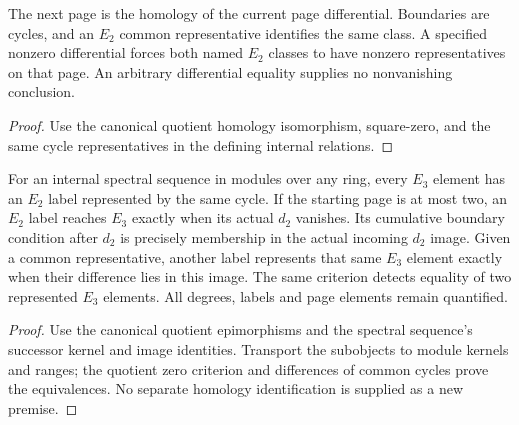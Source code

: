 \begin{proposition}
  \label{prop:internal-page-calculus}
  \leanok
  The next page is the homology of the current page differential. Boundaries
  are cycles, and an $E_2$ common representative identifies the same class.
  A specified nonzero differential forces both named $E_2$ classes to have
  nonzero representatives on that page. An arbitrary differential equality
  supplies no nonvanishing conclusion.
\end{proposition}
\begin{proof}
  Use the canonical quotient homology isomorphism, square-zero, and the same
  cycle representatives in the defining internal relations.
  \leanok
\end{proof}

\begin{proposition}
  \label{prop:internal-page-three-representatives}
  \leanok
  For an internal spectral sequence in modules over any ring, every
  $E_3$ element has an $E_2$ label represented by the same cycle.
  If the starting page is at most two, an $E_2$ label reaches $E_3$
  exactly when its actual $d_2$ vanishes. Its cumulative boundary
  condition after $d_2$ is precisely membership in the actual incoming
  $d_2$ image. Given a common representative, another label represents
  that same $E_3$ element exactly when their difference lies in this image.
  The same criterion detects equality of two represented $E_3$ elements.
  All degrees, labels and page elements remain quantified.
\end{proposition}
\begin{proof}
  \leanok
  Use the canonical quotient epimorphisms and the spectral sequence's
  successor kernel and image identities. Transport the subobjects to
  module kernels and ranges; the quotient zero criterion and differences
  of common cycles prove the equivalences. No separate homology
  identification is supplied as a new premise.
\end{proof}

